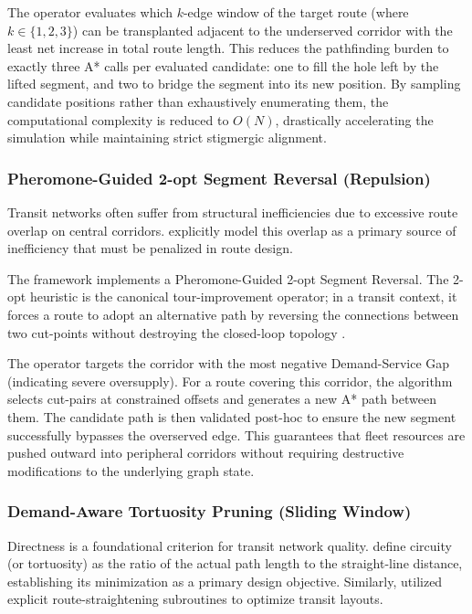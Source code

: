 {{The operator evaluates which $k$-edge window of the target route (where $k \in \{1, 2, 3\}$) can be transplanted adjacent to the underserved corridor with the least net increase in total route length. This reduces the pathfinding burden to exactly three A* calls per evaluated candidate: one to fill the hole left by the lifted segment, and two to bridge the segment into its new position. By sampling candidate positions rather than exhaustively enumerating them, the computational complexity is reduced to $O(N)$, drastically accelerating the simulation while maintaining strict stigmergic alignment.

\subsubsection{Pheromone-Guided 2-opt Segment Reversal (Repulsion)}
\label{sec:2opt_repulsion}
\noindent Transit networks often suffer from structural inefficiencies due to excessive route overlap on central corridors. \cite{kepaptsoglou2009transit} explicitly model this overlap as a primary source of inefficiency that must be penalized in route design. 

The framework implements a Pheromone-Guided 2-opt Segment Reversal. The 2-opt heuristic is the canonical tour-improvement operator; in a transit context, it forces a route to adopt an alternative path by reversing the connections between two cut-points without destroying the closed-loop topology \citep{ciaffi2012feeder}. 

The operator targets the corridor with the most negative Demand-Service Gap (indicating severe oversupply). For a route covering this corridor, the algorithm selects cut-pairs at constrained offsets and generates a new A* path between them. The candidate path is then validated post-hoc to ensure the new segment successfully bypasses the overserved edge. This guarantees that fleet resources are pushed outward into peripheral corridors without requiring destructive modifications to the underlying graph state.

\subsubsection{Demand-Aware Tortuosity Pruning (Sliding Window)}
\label{sec:tortuosity_pruning}
\noindent Directness is a foundational criterion for transit network quality. \cite{ceder1986bus} define circuity (or tortuosity) as the ratio of the actual path length to the straight-line distance, establishing its minimization as a primary design objective. Similarly, \cite{baaj1991transit} utilized explicit route-straightening subroutines to optimize transit layouts.

}}
